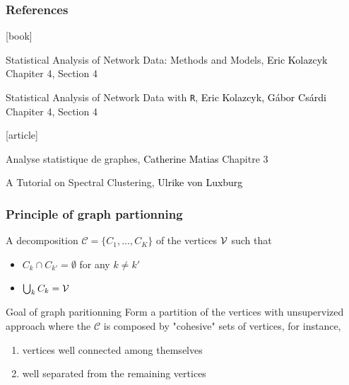 \documentclass{beamer}\usepackage[]{graphicx}\usepackage[]{color}
\begin{document}
\begin{frame} 
  \frametitle{References}

    \begin{thebibliography}{99}
      [book]

     Statistical Analysis of Network Data: Methods and Models,
    \newblock \textcolor{black}{Eric Kolazcyk}
    \newblock \alert{Chapiter 4, Section 4}

     Statistical Analysis of Network Data with \texttt{R}, 
    \newblock \textcolor{black}{Eric Kolazcyk, G\'abor Cs\'ardi}
    \newblock \alert{Chapiter 4, Section 4}

      [article]

     Analyse statistique de graphes, 
    \newblock \textcolor{black}{Catherine Matias}
    \newblock \alert{Chapitre 3}
    
     A Tutorial on Spectral Clustering, 
    \newblock \textcolor{black}{Ulrike von Luxburg}

    \end{thebibliography}

\end{frame}

\begin{frame}
  \frametitle{Principle of graph partionning}

  \begin{definition}[Partition]
    A decomposition $\mathcal{C} = \{C_1,\dots,C_K\}$ of the vertices $\mathcal{V}$ such that
    \begin{itemize}
      \item $C_k \cap C_{k'} = \emptyset$ for any $k\neq k'$
      \item $\bigcup_{k} C_k = \mathcal{V}$
    \end{itemize}
  \end{definition}

  \vfill

  \begin{block}{Goal of graph paritionning}
    Form a partition of the vertices with unsupervized approach where the $\mathcal{C}$ is composed by \alert{"cohesive"} sets of vertices, for instance,
    \begin{enumerate}
      \item vertices well connected among themselves
      \item well separated from the remaining vertices
    \end{enumerate}
    
  \end{block}

\end{frame}
\end{document}

